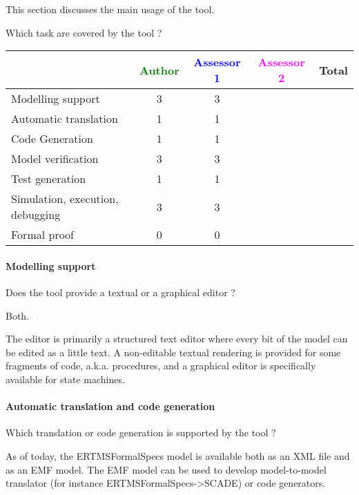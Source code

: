 This section discusses the main usage of the tool.

Which task are covered by the tool ?

\begin{tabular}{|l | c | c | c | c|}
\hline
& \textcolor{green}{Author} & \textcolor{blue}{Assessor 1} & \textcolor{magenta}{Assessor 2} & Total \\
\hline 
Modelling support & 3 & 3 & &  \\
\hline
Automatic translation  & 1 & 1 & & \\
\hline
Code Generation  & 1 & 1 & & \\
\hline
Model verification & 3 & 3 & & \\
\hline
Test generation & 1 & 1 & & \\
\hline
Simulation, execution, debugging & 3 & 3 & & \\
\hline
Formal proof & 0 & 0 & & \\
\hline
\end{tabular}

\paragraph{Modelling support}
Does the tool provide a  textual or a graphical editor ?

\begin{author_comment}
Both.
\end{author_comment}

\begin{assessor1}
The editor is primarily a structured text editor where every bit of the model can be edited as a little text. 
A non-editable textual rendering is provided for some fragments of code, a.k.a. procedures, and a graphical editor is specifically available for state machines. 
\end{assessor1}

\paragraph{Automatic translation and code generation}
Which translation or code generation is supported by the tool ?

\begin{author_comment}
As of today, the ERTMSFormalSpecs model is available both as an XML file and as an EMF model. The EMF model can be used to develop model-to-model translator (for instance ERTMSFormalSpecs->SCADE) or code generators.
\end{author_comment}

